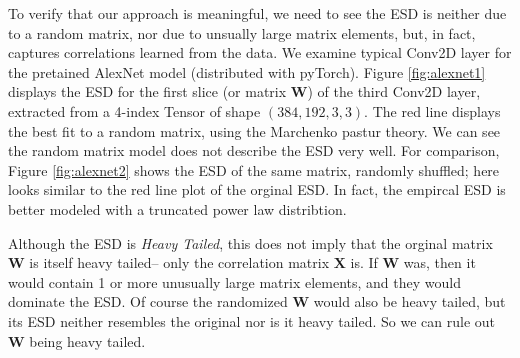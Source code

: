 To verify that our approach is meaningful, we need to see the ESD is neither due to a random matrix, nor due to unsually large matrix elements, but, in fact, captures correlations learned from the data.  We examine typical Conv2D layer for the pretained AlexNet model (distributed with pyTorch).  Figure \ref{fig:alexnet1} displays the ESD for the first slice (or matrix $\mathbf{W}$) of the third Conv2D layer, extracted from a 4-index Tensor of shape $(384, 192, 3, 3)$.  The red line displays the best fit to a random matrix, using the Marchenko pastur theory\cite{MM}.  We can see the random matrix model does not describe the ESD very well. For comparison, Figure \ref{fig:alexnet2} shows the ESD of the same matrix, randomly shuffled; here looks similar to the red line plot of the orginal ESD.  In fact, the empircal ESD is better modeled with a truncated power law distribtion.

Although the ESD is \emph{Heavy Tailed}, this does not imply that the orginal matrix $\mathbf{W}$ is itself heavy tailed--
only the correlation matrix $\mathbf{X}$ is. If $\mathbf{W}$ was, 
then it would contain 1 or more unusually large matrix elements, and they would dominate the ESD.  
Of course the randomized $\mathbf{W}$ would also be heavy tailed, but its ESD neither resembles the original
nor is it heavy tailed.  So we can rule out $\mathbf{W}$ being heavy tailed.

